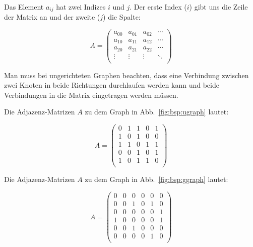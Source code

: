 Das Element $a_{ij}$ hat zwei Indizes $i$ und $j$. Der erste Index ($i$) gibt uns die Zeile der Matrix an und der zweite ($j$) die Spalte:

\[
A = \begin{pmatrix}
  a_{00} & a_{01} & a_{02} & \cdots \\
  a_{10} & a_{11} & a_{12} & \cdots \\
  a_{20} & a_{21} & a_{22} & \cdots \\
  \vdots & \vdots & \vdots & \ddots \\
\end{pmatrix}
\]

Man muss bei ungerichteten Graphen beachten, dass eine Verbindung zwischen zwei Knoten in beide Richtungen durchlaufen werden kann und beide Verbindungen in die Matrix eingetragen werden müssen. 

\begin{mbsp}
Die Adjazenz-Matrizen $A$ zu dem Graph in Abb.~\ref{fig:bsp:ugraph} lautet:

\[ A =  \begin{pmatrix}
  0 & 1 & 1 & 0 & 1 \\
  1 & 0 & 1 & 0 & 0 \\
  1 & 1 & 0 & 1 & 1  \\
  0 & 0 & 1 & 0 & 1 \\
  1 & 0 & 1 & 1 & 0 \\
 \end{pmatrix}
\]
\end{mbsp}


\begin{mbsp}
Die Adjazenz-Matrizen $A$ zu dem Graph in Abb.~\ref{fig:bsp:ggraph} lautet:

\[ 
A =  \begin{pmatrix}
  0 & 0 & 0 & 0 & 0 & 0 \\
  0 & 0 & 1 & 0 & 1 & 0 \\
  0 & 0 & 0 & 0 & 0 & 1 \\
  1 & 0 & 0 & 0 & 0 & 1 \\
  0 & 0 & 1 & 0 & 0 & 0 \\
  0 & 0 & 0 & 0 & 1 & 0 \\
 \end{pmatrix}
  \]
\end{mbsp}

